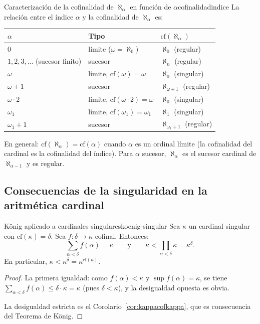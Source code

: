 \begin{ejemplo}{Caracterización de la cofinalidad de $\aleph_\alpha$ en función de $\alpha$}{cofinalidadindice}
La relación entre el índice $\alpha$ y la cofinalidad de $\aleph_\alpha$ es:
\begin{center}
\begin{tabular}{lll}
\textbf{$\alpha$} & \textbf{Tipo} & \textbf{$\mathrm{cf}(\aleph_\alpha)$} \\
\hline
$0$ & límite ($\omega = \aleph_0$) & $\aleph_0$ (regular) \\
$1, 2, 3, \ldots$ (sucesor finito) & sucesor & $\aleph_n$ (regular) \\
$\omega$ & límite, $\mathrm{cf}(\omega) = \omega$ & $\aleph_0$ (singular) \\
$\omega + 1$ & sucesor & $\aleph_{\omega+1}$ (regular) \\
$\omega \cdot 2$ & límite, $\mathrm{cf}(\omega \cdot 2) = \omega$ & $\aleph_0$ (singular) \\
$\omega_1$ & límite, $\mathrm{cf}(\omega_1) = \omega_1$ & $\aleph_1$ (singular) \\
$\omega_1 + 1$ & sucesor & $\aleph_{\omega_1+1}$ (regular) \\
\end{tabular}
\end{center}
\medskip
En general: $\mathrm{cf}(\aleph_\alpha) = \mathrm{cf}(\alpha)$ cuando $\alpha$ es un ordinal límite (la cofinalidad del cardinal es la cofinalidad del índice). Para $\alpha$ sucesor, $\aleph_\alpha$ es el sucesor cardinal de $\aleph_{\alpha-1}$ y es regular.
\end{ejemplo}

\subsection{Consecuencias de la singularidad en la aritmética cardinal}

\begin{teorema}{König aplicado a cardinales singulares}{koenig-singular}
Sea $\kappa$ un cardinal singular con $\mathrm{cf}(\kappa) = \delta$. Sea $f \colon \delta \to \kappa$ cofinal. Entonces:
\[
  \sum_{\alpha < \delta} f(\alpha) = \kappa \qquad \text{y} \qquad
  \kappa < \prod_{\alpha < \delta} \kappa = \kappa^\delta.
\]
En particular, $\kappa < \kappa^\delta = \kappa^{\mathrm{cf}(\kappa)}$.
\end{teorema}

\begin{proof}
La primera igualdad: como $f(\alpha) < \kappa$ y $\sup f(\alpha) = \kappa$, se tiene $\sum_{\alpha<\delta} f(\alpha) \leq \delta \cdot \kappa = \kappa$ (pues $\delta < \kappa$), y la desigualdad opuesta es obvia.

La desigualdad estricta es el Corolario~\ref{cor:kappacofkappa}, que es consecuencia del Teorema de König.
\end{proof}

